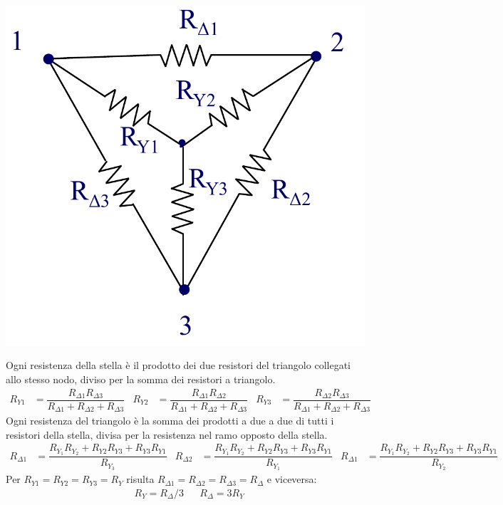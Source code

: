 \documentclass{article}
\begin{document}
\begin{center}
    \includegraphics[scale=0.23]{Image/Stella triangolo insieme.png}
\end{center}
Ogni resistenza della stella è il prodotto dei due
resistori del triangolo collegati allo stesso nodo,
diviso per la somma dei resistori a triangolo.
\begin{align*}
    R_{Y1} &= \dfrac{R_{\Delta 1} R_{\Delta 3}}{R_{\Delta 1} + R_{\Delta 2} + R_{\Delta 3}} &
    R_{Y2} &= \dfrac{R_{\Delta 1} R_{\Delta 2}}{R_{\Delta 1} + R_{\Delta 2} + R_{\Delta 3}} &
    R_{Y3} &= \dfrac{R_{\Delta 2} R_{\Delta 3}}{R_{\Delta 1} + R_{\Delta 2} + R_{\Delta 3}}
\end{align*}
Ogni resistenza del triangolo è la somma dei prodotti a due a due di tutti i
resistori della stella, divisa per la resistenza nel ramo opposto della stella.
\begin{align*}
    R_{\Delta 1} &= \dfrac{R_{Y_1}R_{Y_2} +R_{Y2}R_{Y3} + R_{Y3}R_{Y1}}{R_{Y_3}} &
    R_{\Delta 2} &= \dfrac{R_{Y_1}R_{Y_2} +R_{Y2}R_{Y3} + R_{Y3}R_{Y1}}{R_{Y_1}} &
    R_{\Delta 1} &= \dfrac{R_{Y_1}R_{Y_2} +R_{Y2}R_{Y3} + R_{Y3}R_{Y1}}{R_{Y_2}}
\end{align*}
Per $R_{Y1} = R_{Y2} = R_{Y3} = R_Y$ risulta $R_{\Delta 1} = R_{\Delta 2} = R_{\Delta 3} = R_{\Delta}$ e viceversa:
\begin{align*}
    &R_Y = R_{\Delta}/3
    &
    &R_{\Delta} = 3R_Y
\end{align*}
\end{document}
